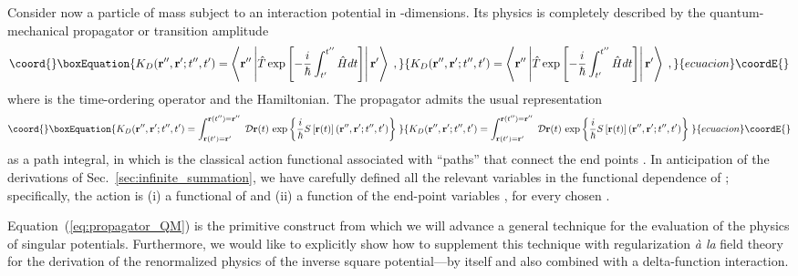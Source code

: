 \documentclass[a4paper,preprint,draft,showpacs,amsmath,amsfonts,amssymb,aps,prd]{revtex4}%
\begin{document}
Consider now a particle of mass \coordHE{} 
subject to an interaction potential \coordHE{} in  \coordHE{}-dimensions.
Its physics is completely described
by the quantum-mechanical propagator or transition amplitude
\begin{equation}\coord{}\boxEquation{ 
 K_{D}  ( {\bf r}'', {\bf r}' ; t'',t' ) 
=
\left\langle 
{\bf r}''
\left| 
\hat{T}
\exp \left[
 -\frac{i}{\hbar} \int_{t'}^{t''}
\hat{H} dt 
\right]
\right|
{\bf r}'
 \right\rangle   
\; ,
\label{eq:propagator_QM_from_evolution_operator}
}{ 
 K_{D}  ( {\bf r}'', {\bf r}' ; t'',t' ) 
=
\left\langle 
{\bf r}''
\left| 
\hat{T}
\exp \left[
 -\frac{i}{\hbar} \int_{t'}^{t''}
\hat{H} dt 
\right]
\right|
{\bf r}'
 \right\rangle   
\; ,
}{ecuacion}\coordE{}\end{equation}
where \coordHE{} is the time-ordering operator
and  \coordHE{} the Hamiltonian.
The propagator
admits the usual representation
\begin{equation}\coord{}\boxEquation{
K_{D}({\bf r}'', {\bf r}' ; t'',t') 
= 
\int_{  {\bf r} (t')  = {\bf r}'  }^{  {\bf r} (t'')  = {\bf r}'' }
 \;  
{\cal D} {\bf r} (t) \,
\exp \left\{ 
\frac{i}{\hbar} 
S \left[ {\bf r}(t)  \right]  ({\bf r}'', {\bf r}' ; t'',t')  
\right\}
\;  
\label{eq:propagator_QM}
}{
K_{D}({\bf r}'', {\bf r}' ; t'',t') 
= 
\int_{  {\bf r} (t')  = {\bf r}'  }^{  {\bf r} (t'')  = {\bf r}'' }
 \;  
{\cal D} {\bf r} (t) \,
\exp \left\{ 
\frac{i}{\hbar} 
S \left[ {\bf r}(t)  \right]  ({\bf r}'', {\bf r}' ; t'',t')  
\right\}
\;  
}{ecuacion}\coordE{}\end{equation}
as a path integral, in which 
\coordHE{} 
is the classical action functional
associated with ``paths''
\coordHE{} that connect the end points
\coordHE{}.
In anticipation of the derivations of Sec.~\ref{sec:infinite_summation},
we have carefully defined all the relevant variables in the functional dependence 
of 
\coordHE{}; specifically, 
the action is 
(i) a functional of 
\coordHE{} and
(ii) a function of the end-point variables
\coordHE{}, 
for every chosen
\coordHE{}.

Equation~(\ref{eq:propagator_QM}) is
the primitive construct 
from which we will advance a general technique for the evaluation of the physics
of singular potentials. 
Furthermore,
we would like to explicitly show how to supplement this technique with regularization
{\it \`{a} la\/} field theory
for the derivation of the renormalized physics of the inverse square
potential---by itself and also combined with a delta-function interaction.
\end{document}
